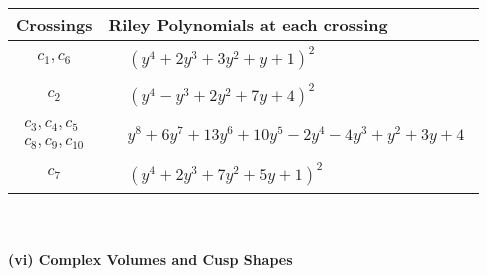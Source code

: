 \documentclass[1p]{elsarticle_modified}
\theoremstyle{definition}
\begin{document}
\begin{tabular}{m{50pt}|m{274pt}}
Crossings & \hspace{64pt}Riley Polynomials at each crossing \\
\hline $$\begin{aligned}c_{1},c_{6}\end{aligned}$$&$\begin{aligned}
&(y^4+2 y^3+3 y^2+y+1)^2
\end{aligned}$\\
\hline $$\begin{aligned}c_{2}\end{aligned}$$&$\begin{aligned}
&(y^4- y^3+2 y^2+7 y+4)^2
\end{aligned}$\\
\hline $$\begin{aligned}c_{3},c_{4},c_{5}\\c_{8},c_{9},c_{10}\end{aligned}$$&$\begin{aligned}
&y^8+6 y^7+13 y^6+10 y^5-2 y^4-4 y^3+y^2+3 y+4
\end{aligned}$\\
\hline $$\begin{aligned}c_{7}\end{aligned}$$&$\begin{aligned}
&(y^4+2 y^3+7 y^2+5 y+1)^2
\end{aligned}$\\
\hline
\end{tabular}\\~\\
\newpage\flushleft \textbf{(vi) Complex Volumes and Cusp Shapes}
\end{document}
